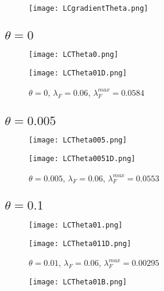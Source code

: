 \documentclass{article}
\newcommand{\lfw}{\lambda_{F}}
\newcommand{\lfw}{\lambda_{F}}
\theoremstyle{definition}
\theoremstyle{remark}
\begin{document}
\begin{figure}[!ht]
\centering
\texttt{[image: LCgradientTheta.png]}
\end{figure}

\newpage

\subsection{$\theta = 0$}

\begin{figure}[!ht]
\centering
\texttt{[image: LCTheta0.png]}
\end{figure}

\begin{figure}[!ht]
\centering
\texttt{[image: LCTheta01D.png]}
\caption{$\theta = 0$, $\lfw = 0.06$, $\lfw^{max} = 0.0584$}
\end{figure}

\newpage

\subsection{$\theta = 0.005$}

\begin{figure}[!ht]
\centering
\texttt{[image: LCTheta005.png]}
\end{figure}

\begin{figure}[!ht]
\centering
\texttt{[image: LCTheta0051D.png]}
\caption{$\theta = 0.005$, $\lfw = 0.06$, $\lfw^{max} = 0.0553$}
\end{figure}

\newpage

\subsection{$\theta = 0.1$}

\begin{figure}[!ht]
\centering
\texttt{[image: LCTheta01.png]}
\end{figure}

\begin{figure}[!ht]
\centering
\texttt{[image: LCTheta011D.png]}
\caption{$\theta = 0.01$, $\lfw = 0.06$, $\lfw^{max} = 0.00295$}
\end{figure}

\newpage
\begin{figure}[!ht]
\centering
\texttt{[image: LCTheta01B.png]}
\end{figure}
\end{document}

